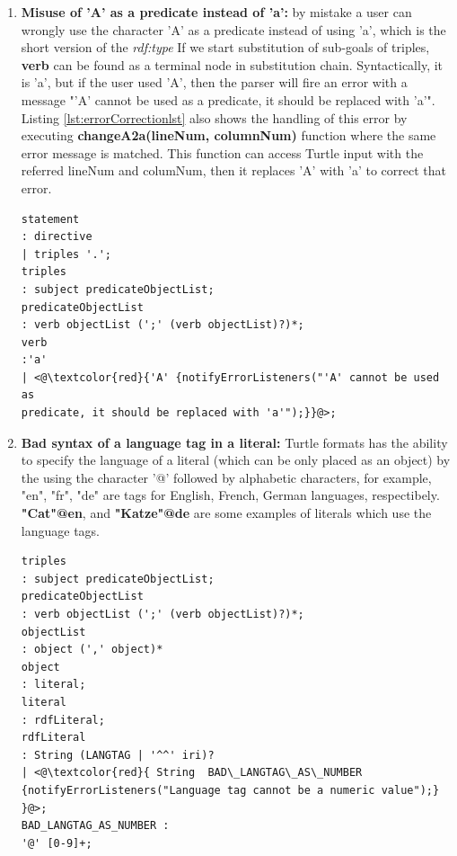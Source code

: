 \begin{enumerate}
\item \textbf{Misuse of 'A' as a predicate instead of 'a':} by mistake a user can wrongly use the character 'A' as a predicate instead of using 'a', which is the short version of the \emph{rdf:type}%
If we start substitution of sub-goals of triples, \textbf{verb} can be found as a terminal node in  substitution chain. 
Syntactically, it is 'a', but if the user used 'A', then the parser will fire an error with a message "’A’ cannot be used as a predicate, it should be replaced with ’a’".
Listing \ref{lst:errorCorrectionlst} also shows the handling of this error by executing \textbf{changeA2a(lineNum, columnNum)} function where the same error message is matched. 
This function can access Turtle input with the referred lineNum and columNum, then it replaces 'A' with 'a' to correct that error. 

\begin{lstlisting}[label=lst:MissuseAex ,  caption={The grammar rule for detecting the misuse of 'A' as a predicate instead of 'a' in the grammar.}] 
statement
: directive
| triples '.';
triples
: subject predicateObjectList;
predicateObjectList
: verb objectList (';' (verb objectList)?)*;
verb
:'a'
| <@\textcolor{red}{'A' {notifyErrorListeners("'A' cannot be used as
predicate, it should be replaced with 'a'");}}@>;
\end{lstlisting}

\item \textbf{Bad syntax of a language tag in a literal:} 
Turtle formats has the ability to specify the language of a literal (which can be only placed as an object) by the using the character '@' followed by alphabetic characters, for example, "en", "fr", "de" are tags for English, French, German languages, respectibely. 
\textbf{"Cat"@en}, and \textbf{"Katze"@de} are some examples of literals which use the language tags.

\begin{lstlisting}[label=lst:badlaguageTag,  caption={Starting rules in the grammar file8}] 
triples
: subject predicateObjectList;
predicateObjectList
: verb objectList (';' (verb objectList)?)*;
objectList
: object (',' object)*
object
: literal;
literal
: rdfLiteral;
rdfLiteral
: String (LANGTAG | '^^' iri)?
| <@\textcolor{red}{ String  BAD\_LANGTAG\_AS\_NUMBER  {notifyErrorListeners("Language tag cannot be a numeric value");} }@>;
BAD_LANGTAG_AS_NUMBER : 
'@' [0-9]+;
\end{lstlisting}


\end{enumerate}
